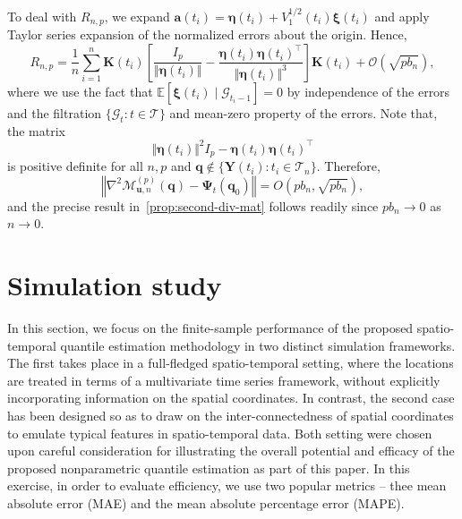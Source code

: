 \documentclass[aos]{imsart}
\theoremstyle{plain}
\theoremstyle{remark}
\def\E{\mathbb{E}}
\newcommand{\Mcal}{\mathcal{M}}
\newcommand{\Gcal}{\mathcal{G}}
\newcommand{\Tcal}{\mathcal{T}}
\newcommand{\bb}[1]{\boldsymbol{#1}}
\newcommand{\tr}{^{\intercal}}
\begin{document}
To deal with $R_{n,p}$, we expand $\bb{a}(t_i) = \bb{\eta}(t_i) + V_1^{1/2}(t_i) \bb{\xi}(t_i)$ and apply Taylor series expansion of the normalized errors about the origin. Hence,
\begin{equation*}
    R_{n,p} = \dfrac{1}{n}\sum_{i=1}^n \bb{K}(t_i) \left[ \dfrac{I_p}{\Vert \bb{\eta}(t_i)\Vert } - \dfrac{\bb{\eta}(t_i) \bb{\eta}(t_i)\tr}{\Vert \bb{\eta}(t_i)\Vert^3 } \right] \bb{K}(t_i) + \mathcal{O}(\sqrt{pb_n}),
\end{equation*}
where we use the fact that $\E\left[ \bb{\xi}(t_i) \mid \Gcal_{t_i-1} \right] = 0$ by independence of the errors and the filtration $\{ \Gcal_t : t\in \Tcal\}$ and mean-zero property of the errors. Note that, the matrix 
\begin{equation*}
    \Vert \bb{\eta}(t_i) \Vert^2 I_p - \bb{\eta}(t_i)\bb{\eta}(t_i)\tr
\end{equation*}
\noindent is positive definite for all $n, p$ and $\bb{q} \notin \{\bb{Y}(t_i) : t_i \in \Tcal_n \}$. Therefore,
\begin{equation*}
    \left\Vert \nabla^2 \Mcal_{\bb{u},n}^{(p)}(\bb{q}) - \bb{\Psi}_t(\bb{q}_0) \right\Vert = O\left(pb_n, \sqrt{pb_n} \right),
\end{equation*}
and the precise result in~\ref{prop:second-div-mat} follows readily since $pb_n \rightarrow 0$ as $n\rightarrow 0$.




\section{Simulation study}
\label{Sec:simulation}

In this section, we focus on the finite-sample performance of the proposed spatio-temporal quantile estimation methodology in two distinct simulation frameworks. The first takes place in a full-fledged spatio-temporal setting, where the locations are treated in terms of a multivariate time series framework, without explicitly incorporating information on the spatial coordinates. In contrast, the second case has been designed so as to draw on the inter-connectedness of spatial coordinates to emulate typical features in spatio-temporal data. Both setting were chosen upon careful consideration for illustrating the overall potential and efficacy of the proposed nonparametric quantile estimation as part of this paper. In this exercise, in order to evaluate efficiency, we use two popular metrics -- thee mean absolute error (MAE) and the mean absolute percentage error (MAPE). 
\end{document}

